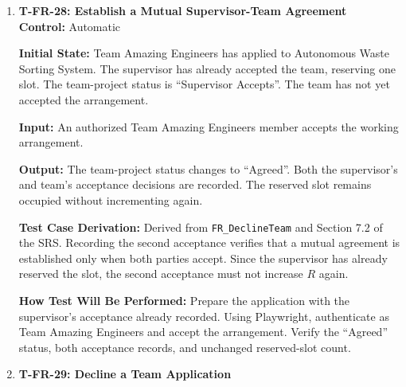 \documentclass[12pt, titlepage]{article}
\begin{document}
\begin{enumerate}
\textbf{Test Case Derivation:} Derived from \texttt{FR\_DeclineTeam} and the capacity rules in Section 7.2 of the SRS. Remaining capacity is calculated as $C_{remaining}=C_{max}-R$. Initially, $C_{remaining}=2-1=1$. After supervisor acceptance, $R \leftarrow R+1=2$, resulting in $C_{remaining}=2-2=0$. These values verify that supervisor acceptance reserves exactly one slot and updates the project to ``Full''.

\textbf{How Test Will Be Performed:} Configure the project and Team Fantastic Coders's pending application. Using Playwright, authenticate as the supervisor and accept Team Fantastic Coders. Verify the updated team-project status, acceptance record, reserved slot count, and project availability.

\item \label{T-FR-28}\textbf{T-FR-28: Establish a Mutual Supervisor-Team Agreement}\\

\textbf{Control:} Automatic

\textbf{Initial State:} Team Amazing Engineers has applied to Autonomous Waste Sorting System. The supervisor has already accepted the team, reserving one slot. The team-project status is ``Supervisor Accepts''. The team has not yet accepted the arrangement.

\textbf{Input:} An authorized Team Amazing Engineers member accepts the working arrangement.

\textbf{Output:} The team-project status changes to ``Agreed''. Both the supervisor's and team's acceptance decisions are recorded. The reserved slot remains occupied without incrementing again.

\textbf{Test Case Derivation:} Derived from \texttt{FR\_DeclineTeam} and Section 7.2 of the SRS. Recording the second acceptance verifies that a mutual agreement is established only when both parties accept. Since the supervisor has already reserved the slot, the second acceptance must not increase $R$ again.

\textbf{How Test Will Be Performed:} Prepare the application with the supervisor's acceptance already recorded. Using Playwright, authenticate as Team Amazing Engineers and accept the arrangement. Verify the ``Agreed'' status, both acceptance records, and unchanged reserved-slot count.

\item \label{T-FR-29}\textbf{T-FR-29: Decline a Team Application}\\


\end{enumerate}
\end{document}
